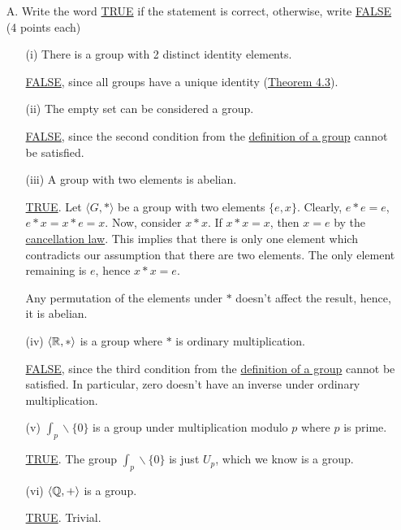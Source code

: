 \begin{enumerate}
    \item[A.] Write the word \underline{TRUE} if the statement is correct, otherwise, write \underline{FALSE} (4 points each)
    \begin{enumerate}
        \item[(i)] There is a group with 2 distinct identity elements.

        \underline{FALSE}, since all groups have a unique identity (\hyperref[thm:unique-identity]{Theorem 4.3}).

        \item[(ii)] The empty set can be considered a group.

        \underline{FALSE}, since the second condition from the \hyperref[dfn:group]{definition of a group} cannot be satisfied.

        \item[(iii)] A group with two elements is abelian.

        \underline{TRUE}. Let \(\langle G, * \rangle\) be a group with two elements \(\{e, x\}\). Clearly, \(e * e = e\), \(e * x = x * e = x\). Now, consider \(x * x\). If \(x * x = x\), then \(x = e\) by the \hyperref[thm:cancellation-law]{cancellation law}. This implies that there is only one element which contradicts our assumption that there are two elements. The only element remaining is \(e\), hence \(x * x = e\). 

        Any permutation of the elements under \(*\) doesn't affect the result, hence, it is abelian.

        \item[(iv)]\(\langle \mathbb{R}, *\rangle\) is a group where \(*\) is ordinary multiplication.

        \underline{FALSE}, since the third condition from the \hyperref[dfn:group]{definition of a group} cannot be satisfied. In particular, zero doesn't have an inverse under ordinary multiplication.

        \item[(v)]\(\int_p \backslash \{0\}\) is a group under multiplication modulo \(p\) where \(p\) is prime.

        \underline{TRUE}. The group \(\int_p \backslash \{0\}\) is just \(U_p\), which we know is a group.

        \item[(vi)] \(\langle \mathbb{Q}, +\rangle\) is a group.

        \underline{TRUE}. Trivial.


\end{enumerate}
\end{enumerate}
